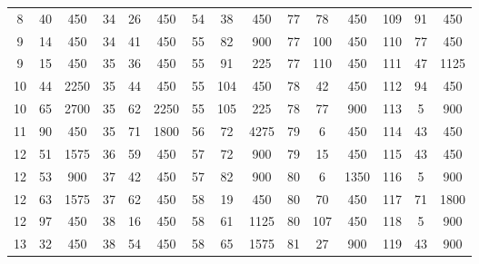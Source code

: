 \begin{center}
\begin{tabular}{|c|c|c||c|c|c||c|c|c||c|c|c||c|c|c|}
        8          & 40         & 450        & 34         & 26         & 450        & 54         & 38         & 450        & 77         & 78         & 450        & 109        & 91         & 450        \\
        9          & 14         & 450        & 34         & 41         & 450        & 55         & 82         & 900        & 77         & 100        & 450        & 110        & 77         & 450        \\
        9          & 15         & 450        & 35         & 36         & 450        & 55         & 91         & 225        & 77         & 110        & 450        & 111        & 47         & 1125       \\
        10         & 44         & 2250       & 35         & 44         & 450        & 55         & 104        & 450        & 78         & 42         & 450        & 112        & 94         & 450        \\
        10         & 65         & 2700       & 35         & 62         & 2250       & 55         & 105        & 225        & 78         & 77         & 900        & 113        & 5          & 900        \\
        11         & 90         & 450        & 35         & 71         & 1800       & 56         & 72         & 4275       & 79         & 6          & 450        & 114        & 43         & 450        \\
        12         & 51         & 1575       & 36         & 59         & 450        & 57         & 72         & 900        & 79         & 15         & 450        & 115        & 43         & 450        \\
        12         & 53         & 900        & 37         & 42         & 450        & 57         & 82         & 900        & 80         & 6          & 1350       & 116        & 5          & 900        \\
        12         & 63         & 1575       & 37         & 62         & 450        & 58         & 19         & 450        & 80         & 70         & 450        & 117        & 71         & 1800       \\
        12         & 97         & 450        & 38         & 16         & 450        & 58         & 61         & 1125       & 80         & 107        & 450        & 118        & 5          & 900        \\
        13         & 32         & 450        & 38         & 54         & 450        & 58         & 65         & 1575       & 81         & 27         & 900        & 119        & 43         & 900        \\

\end{tabular}
\end{center}
